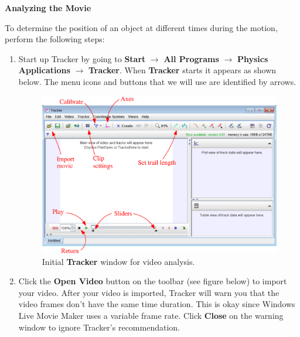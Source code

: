 \textbf{Analyzing the Movie} 

To determine the position of an object at different times during the
motion, perform the following steps:

\begin{enumerate}

\item Start up Tracker by going to {\bf Start} $\rightarrow$ {\bf All Programs} $\rightarrow$ 
{\bf Physics Applications} $\rightarrow$ {\bf Tracker}. 
When {\bf Tracker} starts it appears as shown below. The menu icons and buttons that we will use are identified by arrows.
\begin{figure}[hbt]
\begin{center}
\includegraphics[width=5.5in]{appendices/video_analysis_tracker_fig1d.eps}
\caption{Initial {\bf Tracker} window for video analysis.}
\end{center}
\end{figure}

\item Click the {\bf Open Video} button on the toolbar (see figure below) to import your video. 
After your video is imported, Tracker will warn you that the video frames don't have the same time duration. 
This is okay since Windows Live Movie Maker uses a variable frame rate. 
Click {\bf Close} on the warning window to ignore Tracker's recommendation.


\end{enumerate}
